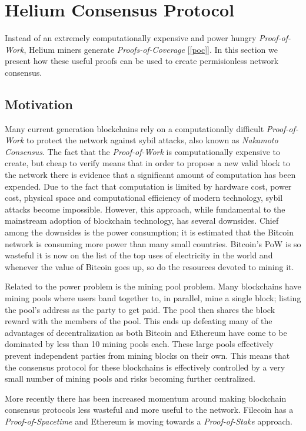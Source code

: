 \documentclass[UTF8, 10pt, nonatbib, nocopyrightspace, reprint]{sigplanconf}
\newcommand{\secref}[1]{[\autoref{#1}]}
\begin{document}
\section{Helium Consensus Protocol}\label{consensus}

Instead of an extremely computationally expensive and power hungry \emph{Proof-of-Work}, Helium miners generate \emph{Proofs-of-Coverage} \secref{poc}. In this section we present how these useful proofs can be used to create permisionless network consensus.

\subsection{Motivation}

Many current generation blockchains rely on a computationally difficult \emph{Proof-of-Work} to protect the network against sybil attacks, also known as \emph{Nakamoto Consensus}. The fact that the \emph{Proof-of-Work} is computationally expensive to create, but cheap to verify means that in order to propose a new valid block to the network there is evidence that a significant amount of computation has been expended. Due to the fact that computation is limited by hardware cost, power cost, physical space and computational efficiency of modern technology, sybil attacks become impossible. However, this approach, while fundamental to the mainstream adoption of blockchain technology, has several downsides. Chief among the downsides is the power consumption; it is estimated that the Bitcoin network is consuming more power than many small countries. Bitcoin's PoW is so wasteful it is now on the list of the top uses of electricity in the world and whenever the value of Bitcoin goes up, so do the resources devoted to mining it.

Related to the power problem is the mining pool problem. Many blockchains have mining pools where users band together to, in parallel, mine a single block; listing the pool's address as the party to get paid. The pool then shares the block reward with the members of the pool. This ends up defeating many of the advantages of decentralization as both Bitcoin and Ethereum have come to be dominated by less than 10 mining pools each. These large pools effectively prevent independent parties from mining blocks on their own. This means that the consensus protocol for these blockchains is effectively controlled by a very small number of mining pools and risks becoming further centralized.

More recently there has been increased momentum around making blockchain consensus protocols less wasteful and more useful to the network. Filecoin \cite{filecoin} has a \emph{Proof-of-Spacetime} and Ethereum \cite{ethereum} is moving towards a \emph{Proof-of-Stake} \cite{pos} approach.
\end{document}
